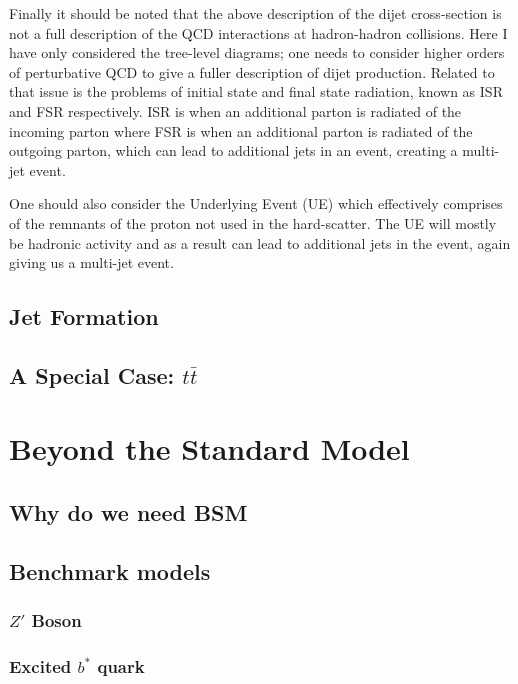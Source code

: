 Finally it should be noted that the above description of the dijet cross-section is
not a full description of the QCD interactions at hadron-hadron collisions.
Here I have only considered the tree-level diagrams;
one needs to consider higher orders of perturbative QCD to give a fuller description of dijet production.
Related to that issue is the problems of initial state and final state radiation, known as ISR and FSR respectively.
ISR is when an additional parton is radiated of the incoming parton where FSR is when an additional parton is radiated of the outgoing parton,
which can lead to additional jets in an event, creating a multi-jet event.

One should also consider the Underlying Event (UE) which effectively comprises of the remnants of the proton not used in the hard-scatter.
The UE will mostly be hadronic activity and as a result can lead to additional jets in the event, again giving us a multi-jet event.

\subsection{Jet Formation}


\subsection{A Special Case: $t\bar{t}$}



\section{Beyond the Standard Model}
\label{theo-bsm}

\subsection{Why do we need BSM}
\subsection{Benchmark models}
\subsubsection{$Z'$ Boson}
\subsubsection{Excited $b^*$ quark}
